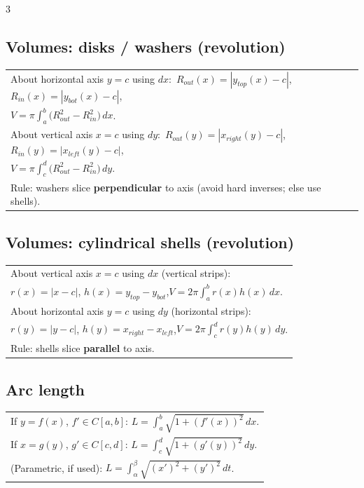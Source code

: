 \documentclass[10pt]{article}
\begin{document}
\begin{multicols}{3}
\subsection*{Volumes: disks / washers (revolution)}
\vspace{-1pt}
\begin{tabular}{@{}p{}@{}}
About horizontal axis $y=c$ using $dx$:\ $R_{out}(x)=|y_{top}(x)-c|$, $R_{in}(x)=|y_{bot}(x)-c|$,\\
\hspace*{1.2em}$V=\pi\int_a^b\big(R_{out}^2-R_{in}^2\big)\,dx$.\\
About vertical axis $x=c$ using $dy$:\ $R_{out}(y)=|x_{right}(y)-c|$, $R_{in}(y)=|x_{left}(y)-c|$,\\
\hspace*{1.2em}$V=\pi\int_c^d\big(R_{out}^2-R_{in}^2\big)\,dy$.\\
Rule: washers slice \textbf{perpendicular} to axis (avoid hard inverses; else use shells).\\
\end{tabular}

\subsection*{Volumes: cylindrical shells (revolution)}
\vspace{-1pt}
\begin{tabular}{@{}p{}@{}}
About vertical axis $x=c$ using $dx$ (vertical strips):\\
\hspace*{1.2em}$r(x)=|x-c|$, $h(x)=y_{top}-y_{bot}$,\quad $V=2\pi\int_a^b r(x)h(x)\,dx$.\\
About horizontal axis $y=c$ using $dy$ (horizontal strips):\\
\hspace*{1.2em}$r(y)=|y-c|$, $h(y)=x_{right}-x_{left}$,\quad $V=2\pi\int_c^d r(y)h(y)\,dy$.\\
Rule: shells slice \textbf{parallel} to axis.\\
\end{tabular}

\subsection*{Arc length}
\vspace{-1pt}
\begin{tabular}{@{}p{}@{}}
If $y=f(x)$, $f'\in C[a,b]$: $\displaystyle L=\int_a^b\sqrt{1+(f'(x))^2}\,dx$.\\
If $x=g(y)$, $g'\in C[c,d]$: $\displaystyle L=\int_c^d\sqrt{1+(g'(y))^2}\,dy$.\\
(Parametric, if used): $L=\int_\alpha^\beta\sqrt{(x')^2+(y')^2}\,dt$.\\
\end{tabular}


\end{multicols}
\end{document}
